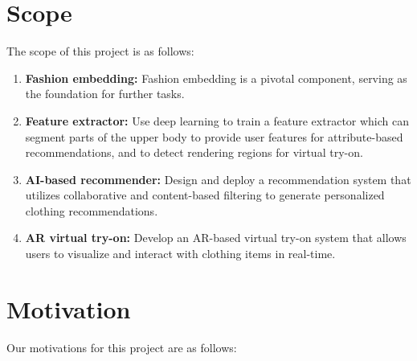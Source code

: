 \section{Scope}
	The scope of this project is as follows:

	\begin{enumerate}
		\item \textbf{Fashion embedding:} Fashion embedding is a pivotal component, serving as the foundation for further tasks.
		\item \textbf{Feature extractor:} Use deep learning to train a feature extractor which can segment parts of the upper body to provide user features for attribute-based recommendations, and to detect rendering regions for virtual try-on.
		\item \textbf{AI-based recommender:} Design and deploy a recommendation system that utilizes collaborative and content-based filtering to generate personalized clothing recommendations.
		\item \textbf{AR virtual try-on:} Develop an AR-based virtual try-on system that allows users to visualize and interact with clothing items in real-time.
	\end{enumerate}

\section{Motivation}
	Our motivations for this project are as follows:

